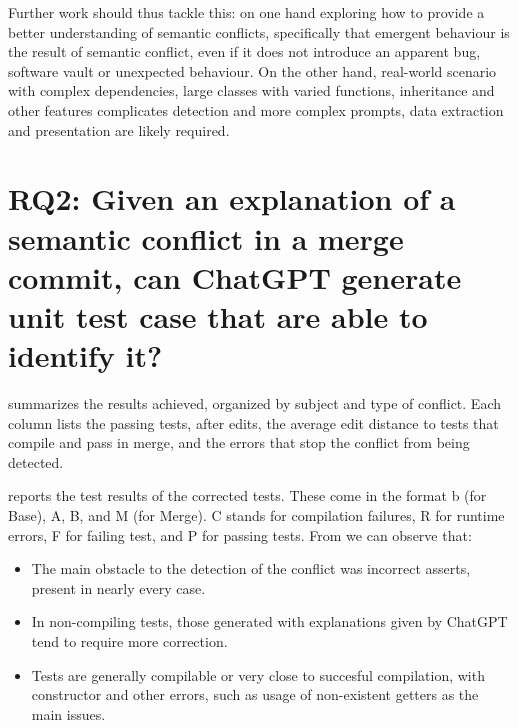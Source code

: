 Further work should thus tackle this: on one hand exploring how to provide a better understanding of semantic conflicts, specifically that emergent behaviour is the result of semantic conflict, even if it does not introduce an apparent bug, software vault or unexpected behaviour.
On the other hand, real-world scenario with complex dependencies, large classes with varied functions, inheritance and other features complicates detection and more complex prompts, data extraction and presentation are likely required.




\section{RQ2: Given an explanation of a semantic conflict in a merge
commit, can ChatGPT generate unit test case that are able to identify it?}\label{sec:results:rq2}

 summarizes the results achieved, organized by subject and
type of conflict.
Each column lists the passing tests, after edits, the average edit distance to tests that compile and pass in merge,
and the errors that stop the conflict from being detected.

 reports the test results of the corrected tests.
These come in the format b (for Base), A, B, and M (for Merge). C stands for compilation failures, R for runtime errors, F for failing test, and P for passing tests.
From  we can observe that:
\begin{itemize}
  \item The main obstacle to the detection of the conflict was incorrect asserts, present in nearly every case.
  \item In non-compiling tests, those generated with explanations given by ChatGPT tend to require more correction.
  \item Tests are generally compilable or very close to succesful compilation, with constructor and other errors, such as usage of non-existent getters as the main issues.
\end{itemize}

